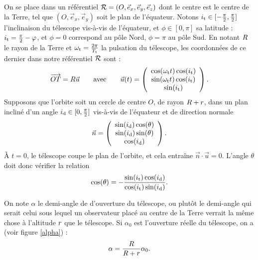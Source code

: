On se place dans un référentiel $\mathcal{R} = (O,\vec{e}_x,\vec{e}_y,\vec{e}_z)$ dont le centre est le centre de la Terre, tel que $(O,\vec{e}_x,\vec{e}_y)$ soit le plan de l'équateur. Notons $i_\text{t} \in [-\frac{\pi}{2}, \frac{\pi}{2}]$ l'inclinaison du télescope vis-à-vis de l'équateur, et $\phi \in [0,\pi]$ sa latitude : $i_\text{t} = \frac{\pi}{2} - \varphi$, et $\phi=0$ correspond au pôle Nord, $\phi = \pi$ au pôle Sud. En notant  $R$ le rayon de la Terre et $\omega_\text{t} = \frac{2\pi}{T_\text{t}}$ la pulsation du télescope, les coordonnées de ce dernier dans notre référentiel $\mathcal{R}$  sont :
\[ 
\overrightarrow{OT} = R \vec{u} \qquad \text{avec} \qquad \vec{u}(t) = \left(\begin{array}{c}
\cos(\omega_\text{t} t) \cos(i_\text{t}) \\
\sin(\omega_\text{t} t) \cos(i_\text{t}) \\
\sin(i_\text{t})
\end{array}
\right).
\]
Supposons que l'orbite soit un cercle de centre $O$, de rayon $R+r$, dans un plan incliné d'un angle $i_\text{d} \in [0, \frac{\pi}{2}]$ vis-à-vis de l'équateur et de direction normale
\[ 
\vec{n} =  \left(\begin{array}{c}
 \sin(i_\text{d})\cos(\theta) \\
\sin(i_\text{d})\sin(\theta) \\
 \cos(i_\text{d}) 
\end{array}
\right).
\]
À $t=0$, le télescope coupe le plan de l'orbite, et cela entraîne $\vec{n}\cdot \vec{u} = 0$. L'angle $\theta$ doit donc vérifier la relation
\[ \cos(\theta) = - \frac{\sin(i_\text{t})\cos(i_\text{d})}{\cos(i_\text{t})\sin(i_\text{d})}.\]

On note $\alpha$ le demi-angle de d'ouverture du télescope, ou plutôt le demi-angle qui serait celui sous lequel un observateur placé au centre de la Terre verrait la même chose à l'altitude $r$ que le télescope. Si $\alpha_0$ est l'ouverture réelle du télescope, on a (voir figure \ref{alpha}) :
\[ \alpha = \frac{R}{R+r} \alpha_0.\]

